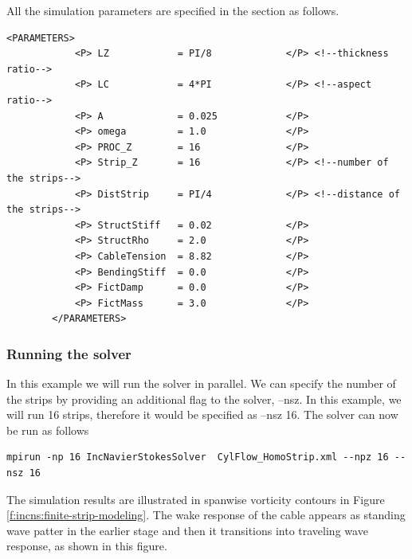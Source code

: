 All the simulation parameters are specified in the section as follows.

    \begin{lstlisting}[style=XMLStyle]
        <PARAMETERS>
            <P> LZ            = PI/8             </P> <!--thickness ratio-->
            <P> LC            = 4*PI             </P> <!--aspect ratio-->
            <P> A             = 0.025            </P>
            <P> omega         = 1.0              </P>
            <P> PROC_Z        = 16               </P>
            <P> Strip_Z       = 16               </P> <!--number of the strips-->
            <P> DistStrip     = PI/4             </P> <!--distance of the strips-->
            <P> StructStiff   = 0.02             </P>  
            <P> StructRho     = 2.0              </P>
            <P> CableTension  = 8.82             </P>
            <P> BendingStiff  = 0.0              </P>
            <P> FictDamp      = 0.0              </P>
            <P> FictMass      = 3.0              </P>
        </PARAMETERS>
     \end{lstlisting}    

\subsubsection{Running the solver}
In this example we will run the solver in parallel. We can specify the number of the strips by providing an additional flag to the solver, –nsz. In this example, we will run 16 strips, therefore it would be specified as –nsz 16. The solver can now be run as follows    

\begin{lstlisting}[style=BashInputStyle]
mpirun -np 16 IncNavierStokesSolver  CylFlow_HomoStrip.xml --npz 16 --nsz 16
\end{lstlisting}

The simulation results are illustrated in spanwise vorticity contours in Figure \ref{f:incns:finite-strip-modeling}. The wake response of the cable appears as standing wave patter in the earlier stage and then it transitions into traveling wave response, as shown in this figure.  

